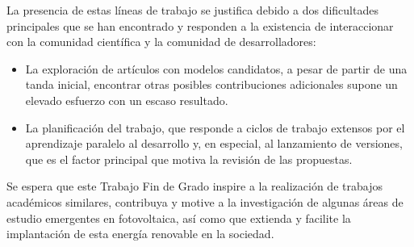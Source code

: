 La presencia de estas líneas de trabajo se justifica debido a dos dificultades principales que se han encontrado y responden a la existencia de interaccionar con la comunidad científica y la comunidad de desarrolladores:

\begin{itemize}
    \item La exploración de artículos con modelos candidatos, a pesar de partir de una tanda inicial, encontrar otras posibles contribuciones adicionales supone un elevado esfuerzo con un escaso resultado.
    \item La planificación del trabajo, que responde a ciclos de trabajo extensos por el aprendizaje paralelo al desarrollo y, en especial, al lanzamiento de versiones, que es el factor principal que motiva la revisión de las propuestas.
\end{itemize}

Se espera que este Trabajo Fin de Grado inspire a la realización de trabajos académicos similares, contribuya y motive a la investigación de algunas áreas de estudio emergentes en fotovoltaica, así como que extienda y facilite la implantación de esta energía renovable en la sociedad.
